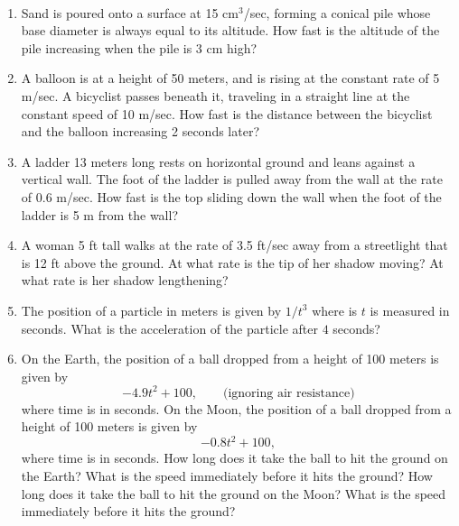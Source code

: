 \begin{exercise}~\\
    \begin{enumerate} 
        \item Sand is poured onto a surface at 15 cm${}^3$/sec, forming a conical pile whose base diameter is always equal to its altitude. How fast is the altitude of the pile increasing when the pile is 3 cm high? \cite{mooc}
        \item A balloon is at a height of 50 meters, and is rising at the constant rate of 5 m/sec.  A bicyclist passes beneath it, traveling in a straight line at the constant speed of 10 m/sec. How fast is the distance between the bicyclist and the balloon increasing 2 seconds later? \cite{mooc}
        \item A ladder 13 meters long rests on horizontal ground and leans against a vertical wall.  The foot of the ladder is pulled away from the wall at the rate of 0.6 m/sec.  How fast is the top sliding down the wall when the foot of the ladder is 5 m from the wall? \cite{mooc}
        \item A woman 5 ft tall walks at the rate of 3.5 ft/sec away from a streetlight that is 12 ft above the ground.  At what rate is the tip of her shadow moving?  At what rate is her shadow lengthening? \cite{mooc}
        \item The position of a particle in meters is given by $1/t^3$ where is $t$ is measured in seconds. What is the acceleration of the particle after $4$ seconds? \cite{mooc}
        \item On the Earth, the position of a ball dropped from a height of 100 meters is given by \[-4.9t^2+100,\qquad\text{(ignoring air resistance)}\] where time is in seconds.  On the Moon, the position of a ball dropped from a height of 100 meters is given by \[-0.8t^2+100,\] where time is in seconds.  How long does it take the ball to hit the ground on the Earth? What is the speed immediately before it hits the ground? How long does it take the ball to hit the ground on the Moon? What is the speed immediately before it hits the ground? \cite{mooc}
    \end{enumerate}
\end{exercise}
